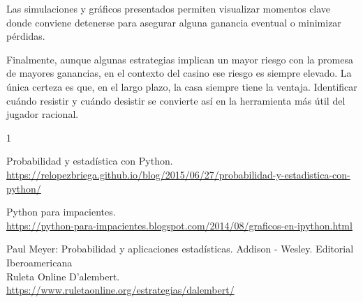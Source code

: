 \documentclass{article}
\begin{document}
Las simulaciones y gráficos presentados permiten visualizar momentos clave donde conviene detenerse para asegurar alguna ganancia eventual o minimizar pérdidas.

Finalmente, aunque algunas estrategias implican un mayor riesgo con la promesa de mayores ganancias, en el contexto del casino ese riesgo es siempre elevado. La única certeza es que, en el largo plazo, la casa siempre tiene la ventaja. Identificar cuándo resistir y cuándo desistir se convierte así en la herramienta más útil del jugador racional.



  


\renewcommand{\refname}{Bibliografía}

\begin{thebibliography}{1}

Probabilidad y estadística con Python.\\
\url{https://relopezbriega.github.io/blog/2015/06/27/probabilidad-y-estadistica-con-python/}

Python para impacientes.\\
\url{https://python-para-impacientes.blogspot.com/2014/08/graficos-en-ipython.html}

Paul Meyer: Probabilidad y aplicaciones estadísticas. Addison - Wesley. Editorial Iberoamericana\\

Ruleta Online D'alembert.\\
\url{https://www.ruletaonline.org/estrategias/dalembert/}

\end{thebibliography}
\end{document}
